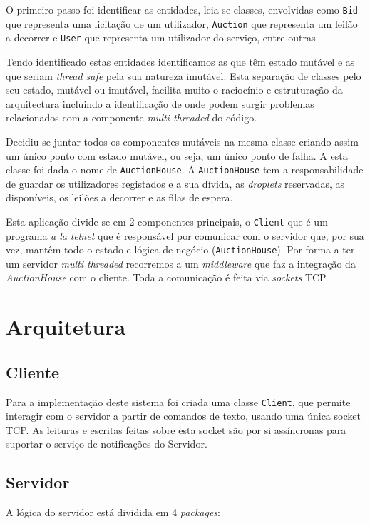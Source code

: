 \documentclass[a4paper]{article}
\begin{document}
O primeiro passo foi identificar as entidades, leia-se classes, envolvidas como \texttt{Bid} que representa uma licitação de um utilizador, \texttt{Auction} que representa um leilão a decorrer e \texttt{User} que representa um utilizador do serviço, entre outras.

Tendo identificado estas entidades identificamos as que têm estado mutável e as que seriam \textit{thread safe} pela sua natureza imutável. Esta separação de classes pelo seu estado, mutável ou imutável, facilita muito o raciocínio e estruturação da arquitectura incluindo a identificação de onde podem surgir problemas relacionados com a componente \textit{multi threaded} do código.

Decidiu-se juntar todos os componentes mutáveis na mesma classe criando assim um único ponto com estado mutável, ou seja, um único ponto de falha. A esta classe foi dada o nome de \texttt{AuctionHouse}. A \texttt{AuctionHouse} tem a responsabilidade de guardar os utilizadores registados e a sua dívida, as \textit{droplets} reservadas, as disponíveis, os leilões a decorrer e as filas de espera. 

Esta aplicação divide-se em 2 componentes principais, o \texttt{Client} que é um programa \textit{a la} \textit{telnet} que é responsável por comunicar com o servidor que, por sua vez, mantêm todo o estado e lógica de negócio (\texttt{AuctionHouse}). Por forma a ter um servidor \textit{multi threaded} recorremos a um \textit{middleware} que faz a integração da \textit{AuctionHouse} com o cliente. Toda a comunicação é feita via \textit{sockets} TCP.

\section{Arquitetura}
\subsection{Cliente}
Para a implementação deste sistema foi criada uma classe \texttt{Client}, que permite interagir com o servidor a partir de comandos de texto, usando uma única socket TCP. As leituras e escritas feitas sobre esta socket são por si assíncronas para suportar o serviço de notificações do Servidor.

\subsection{Servidor}
A lógica do servidor está dividida em 4 \textit{packages}:
\end{document}
